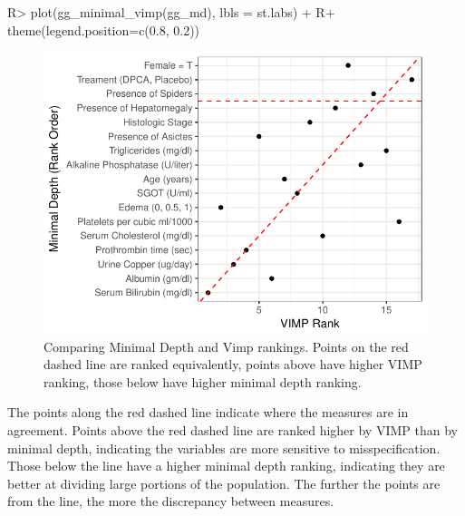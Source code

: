 \documentclass[article, nojss]{jss}
\begin{document}
\begin{Schunk}
\begin{Sinput}
R> plot(gg_minimal_vimp(gg_md), lbls = st.labs) +
R+   theme(legend.position=c(0.8, 0.2))
\end{Sinput}
\begin{figure}[!htb]

{\centering \includegraphics{rfs-depthVimp-1}

}

\caption[Comparing Minimal Depth and Vimp rankings]{Comparing Minimal Depth and Vimp rankings. Points on the red dashed line are ranked equivalently, points above have higher VIMP ranking, those below have higher minimal depth ranking.}\label{fig:depthVimp}
\end{figure}
\end{Schunk}

The points along the red dashed line indicate where the measures are in
agreement. Points above the red dashed line are ranked higher by VIMP
than by minimal depth, indicating the variables are more sensitive to
misspecification. Those below the line have a higher minimal depth
ranking, indicating they are better at dividing large portions of the
population. The further the points are from the line, the more the
discrepancy between measures.
\end{document}
